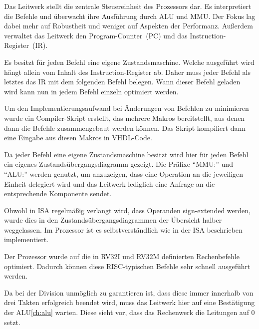 
\label{ch:cu}

Das Leitwerk stellt die zentrale Steuereinheit des Prozessors dar. Es
interpretiert die Befehle und \"uberwacht ihre Ausf\"uhrung durch ALU und MMU.
Der Fokus lag dabei mehr auf Robustheit und weniger auf Aspekten der
Performanz. Au\ss{}erdem verwaltet das Leitwerk den Program-Counter~(PC) und
das Instruction-Register~(IR).

Es besitzt f\"ur jeden Befehl eine eigene Zustandsmaschine. Welche
ausgef\"uhrt wird h\"angt allein vom Inhalt des Instruction-Register ab. Daher
muss jeder Befehl als letztes das IR mit dem folgenden Befehl belegen. Wann
dieser Befehl geladen wird kann nun in jedem Befehl einzeln optimiert werden.

Um den Implementierungsaufwand bei \"Anderungen von Befehlen zu minimieren
wurde ein Compiler-Skript erstellt, das mehrere Makros bereitstellt, aus denen
dann die Befehle zusammengebaut werden k\"onnen. Das Skript kompiliert dann
eine Eingabe aus diesen Makros in VHDL-Code.

Da jeder Befehl eine eigene Zustandsmaschine besitzt wird hier f\"ur jeden
Befehl ein eigenes Zustands\-\"uber\-gangs\-dia\-gramm gezeigt. Die Pr\"afixe
``MMU:'' und ``ALU:'' werden genutzt, um anzuzeigen, dass eine Operation an die
jeweiligen Einheit delegiert wird und das Leitwerk lediglich eine Anfrage an
die entsprechende Komponente sendet.

Obwohl in ISA regelm\"a\ss{}ig verlangt wird, dass Operanden sign-extended
werden, wurde dies in den Zustands\-\"uber\-gangs\-dia\-grammen der \"Ubersicht
halber weggelassen. Im Prozessor ist es selbstverst\"andlich wie in der ISA
beschrieben implementiert.

Der Prozessor wurde auf die in RV32I und RV32M definierten Rechenbefehle
optimiert. Dadurch k\"onnen diese RISC-typischen Befehle sehr schnell
ausgef\"uhrt werden.


Da bei der Division unm\"oglich zu garantieren ist, dass diese immer innerhalb
von drei Takten erfolgreich beendet wird, muss das Leitwerk hier auf eine
Best\"atigung der ALU\ref{ch:alu} warten. Diese sieht vor, dass das Rechenwerk
die Leitungen  auf 0 setzt.

